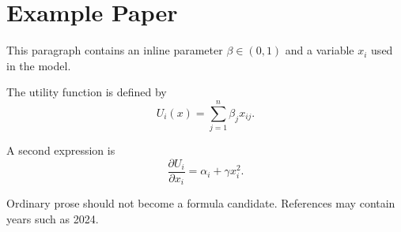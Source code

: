 \documentclass[11pt]{article}
\begin{document}
\section*{Example Paper}
This paragraph contains an inline parameter $\beta \in (0,1)$ and a variable $x_i$ used in the model.

The utility function is defined by
\begin{equation}
U_i(x)=\sum_{j=1}^{n}\beta_j x_{ij}.
\end{equation}

A second expression is
\begin{equation}
\frac{\partial U_i}{\partial x_i}=\alpha_i+\gamma x_i^2.
\end{equation}

Ordinary prose should not become a formula candidate. References may contain years such as 2024.
\end{document}
